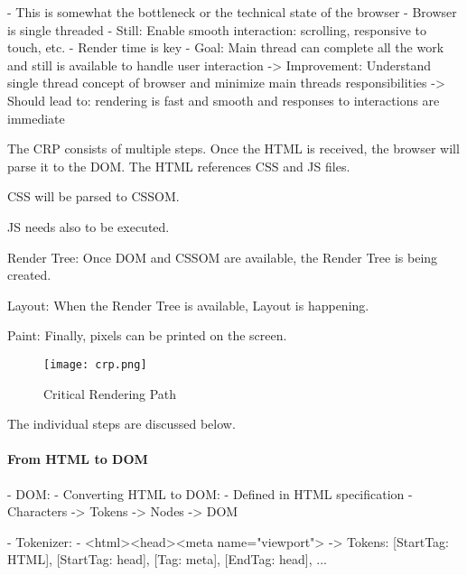 
- This is somewhat the bottleneck or the technical state of the browser
- Browser is single threaded
- Still: Enable smooth interaction: scrolling, responsive to touch, etc.
- Render time is key
- Goal: Main thread can complete all the work and still is available to handle user interaction
-> Improvement: Understand single thread concept of browser and minimize main threads responsibilities
-> Should lead to: rendering is fast and smooth and responses to interactions are immediate




The CRP consists of multiple steps.
Once the HTML is received, the browser will parse it to the DOM.
The HTML references CSS and JS files.

CSS will be parsed to CSSOM.

JS needs also to be executed.

Render Tree: Once DOM and CSSOM are available, the Render Tree is being created.

Layout: When the Render Tree is available, Layout is happening.

Paint: Finally, pixels can be printed on the screen.

\begin{figure}[h!]
\begin{center}
\texttt{[image: crp.png]}
\caption{Critical Rendering Path}
\label{img:crp}
\end{center}
\end{figure}

The individual steps are discussed below.





\paragraph{From HTML to DOM}




- DOM:
	- Converting HTML to DOM:
		- Defined in HTML specification
		- Characters -> Tokens -> Nodes -> DOM

	- Tokenizer:
		- <html><head><meta name="viewport">
		-> Tokens: [StartTag: HTML], [StartTag: head], [Tag: meta], [EndTag: head], ...

